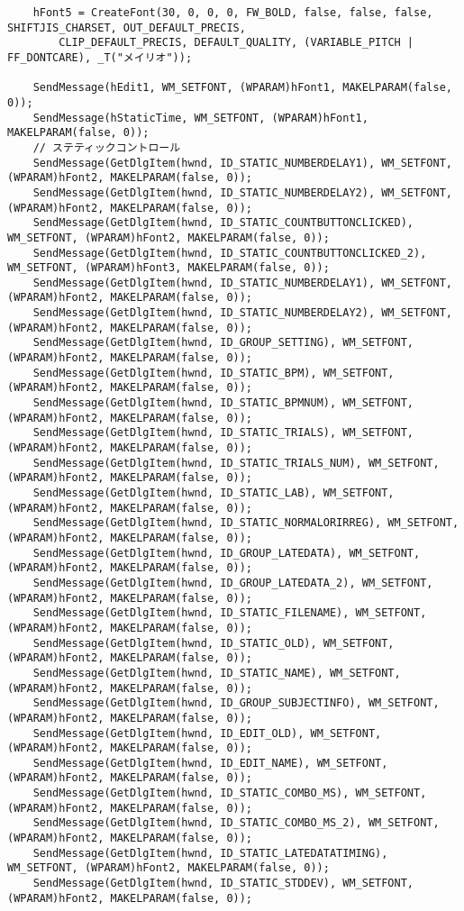 \begin{verbatim}
	hFont5 = CreateFont(30, 0, 0, 0, FW_BOLD, false, false, false, SHIFTJIS_CHARSET, OUT_DEFAULT_PRECIS,
		CLIP_DEFAULT_PRECIS, DEFAULT_QUALITY, (VARIABLE_PITCH | FF_DONTCARE), _T("メイリオ"));

	SendMessage(hEdit1, WM_SETFONT, (WPARAM)hFont1, MAKELPARAM(false, 0));
	SendMessage(hStaticTime, WM_SETFONT, (WPARAM)hFont1, MAKELPARAM(false, 0));
	// ステティックコントロール
	SendMessage(GetDlgItem(hwnd, ID_STATIC_NUMBERDELAY1), WM_SETFONT, (WPARAM)hFont2, MAKELPARAM(false, 0));
	SendMessage(GetDlgItem(hwnd, ID_STATIC_NUMBERDELAY2), WM_SETFONT, (WPARAM)hFont2, MAKELPARAM(false, 0));
	SendMessage(GetDlgItem(hwnd, ID_STATIC_COUNTBUTTONCLICKED), WM_SETFONT, (WPARAM)hFont2, MAKELPARAM(false, 0));
	SendMessage(GetDlgItem(hwnd, ID_STATIC_COUNTBUTTONCLICKED_2), WM_SETFONT, (WPARAM)hFont3, MAKELPARAM(false, 0));
	SendMessage(GetDlgItem(hwnd, ID_STATIC_NUMBERDELAY1), WM_SETFONT, (WPARAM)hFont2, MAKELPARAM(false, 0));
	SendMessage(GetDlgItem(hwnd, ID_STATIC_NUMBERDELAY2), WM_SETFONT, (WPARAM)hFont2, MAKELPARAM(false, 0));
	SendMessage(GetDlgItem(hwnd, ID_GROUP_SETTING), WM_SETFONT, (WPARAM)hFont2, MAKELPARAM(false, 0));
	SendMessage(GetDlgItem(hwnd, ID_STATIC_BPM), WM_SETFONT, (WPARAM)hFont2, MAKELPARAM(false, 0));
	SendMessage(GetDlgItem(hwnd, ID_STATIC_BPMNUM), WM_SETFONT, (WPARAM)hFont2, MAKELPARAM(false, 0));
	SendMessage(GetDlgItem(hwnd, ID_STATIC_TRIALS), WM_SETFONT, (WPARAM)hFont2, MAKELPARAM(false, 0));
	SendMessage(GetDlgItem(hwnd, ID_STATIC_TRIALS_NUM), WM_SETFONT, (WPARAM)hFont2, MAKELPARAM(false, 0));
	SendMessage(GetDlgItem(hwnd, ID_STATIC_LAB), WM_SETFONT, (WPARAM)hFont2, MAKELPARAM(false, 0));
	SendMessage(GetDlgItem(hwnd, ID_STATIC_NORMALORIRREG), WM_SETFONT, (WPARAM)hFont2, MAKELPARAM(false, 0));
	SendMessage(GetDlgItem(hwnd, ID_GROUP_LATEDATA), WM_SETFONT, (WPARAM)hFont2, MAKELPARAM(false, 0));
	SendMessage(GetDlgItem(hwnd, ID_GROUP_LATEDATA_2), WM_SETFONT, (WPARAM)hFont2, MAKELPARAM(false, 0));
	SendMessage(GetDlgItem(hwnd, ID_STATIC_FILENAME), WM_SETFONT, (WPARAM)hFont2, MAKELPARAM(false, 0));
	SendMessage(GetDlgItem(hwnd, ID_STATIC_OLD), WM_SETFONT, (WPARAM)hFont2, MAKELPARAM(false, 0));
	SendMessage(GetDlgItem(hwnd, ID_STATIC_NAME), WM_SETFONT, (WPARAM)hFont2, MAKELPARAM(false, 0));
	SendMessage(GetDlgItem(hwnd, ID_GROUP_SUBJECTINFO), WM_SETFONT, (WPARAM)hFont2, MAKELPARAM(false, 0));
	SendMessage(GetDlgItem(hwnd, ID_EDIT_OLD), WM_SETFONT, (WPARAM)hFont2, MAKELPARAM(false, 0));
	SendMessage(GetDlgItem(hwnd, ID_EDIT_NAME), WM_SETFONT, (WPARAM)hFont2, MAKELPARAM(false, 0));
	SendMessage(GetDlgItem(hwnd, ID_STATIC_COMBO_MS), WM_SETFONT, (WPARAM)hFont2, MAKELPARAM(false, 0));
	SendMessage(GetDlgItem(hwnd, ID_STATIC_COMBO_MS_2), WM_SETFONT, (WPARAM)hFont2, MAKELPARAM(false, 0));
	SendMessage(GetDlgItem(hwnd, ID_STATIC_LATEDATATIMING), WM_SETFONT, (WPARAM)hFont2, MAKELPARAM(false, 0));
	SendMessage(GetDlgItem(hwnd, ID_STATIC_STDDEV), WM_SETFONT, (WPARAM)hFont2, MAKELPARAM(false, 0));


\end{verbatim}
